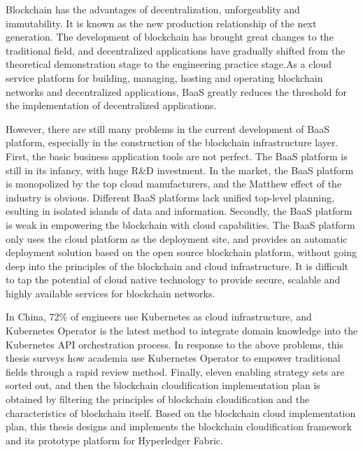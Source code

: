 \documentclass[macfonts,master,oneside]{njuthesis}
\begin{document}
\begin{englishabstract}
  Blockchain has the advantages of decentralization, unforgeablity and immutability. It is known as the new production relationship of the next generation. The development of blockchain has brought great changes to the traditional field, and decentralized applications have gradually shifted from the theoretical demonstration stage to the engineering practice stage.As a cloud service platform for building, managing, hosting and operating blockchain networks and decentralized applications, BaaS greatly reduces the threshold for the implementation of decentralized applications.

  However, there are still many problems in the current development of BaaS platform, especially in the construction of the blockchain infrastructure layer. First, the basic business application tools are not perfect. The BaaS platform is still in its infancy, with huge R\&D investment. In the market, the BaaS platform is monopolized by the top cloud manufacturers, and the Matthew effect of the industry is obvious. Different BaaS platforms lack unified top-level planning, esulting in isolated islands of data and information. Secondly, the BaaS platform is weak in empowering the blockchain with cloud capabilities. The BaaS platform only uses the cloud platform as the deployment site, and provides an automatic deployment solution based on the open source blockchain platform, without going deep into the principles of the blockchain and cloud infrastructure. It is difficult to tap the potential of cloud native technology to provide secure, scalable and highly available services for blockchain networks.

  In China, 72\% of engineers use Kubernetes as cloud infrastructure, and Kubernetes Operator is the latest method to integrate domain knowledge into the Kubernetes API orchestration process. In response to the above problems, this thesis surveys how academia use Kubernetes Operator to empower traditional fields through a rapid review method. Finally, eleven enabling strategy sets are sorted out, and then the blockchain cloudification implementation plan is obtained by filtering the principles of blockchain cloudification and the characteristics of blockchain itself. Based on the blockchain cloud implementation plan, this thesis designs and implements the blockchain cloudification framework and its prototype platform for Hyperledger Fabric.


\end{englishabstract}
\end{document}
